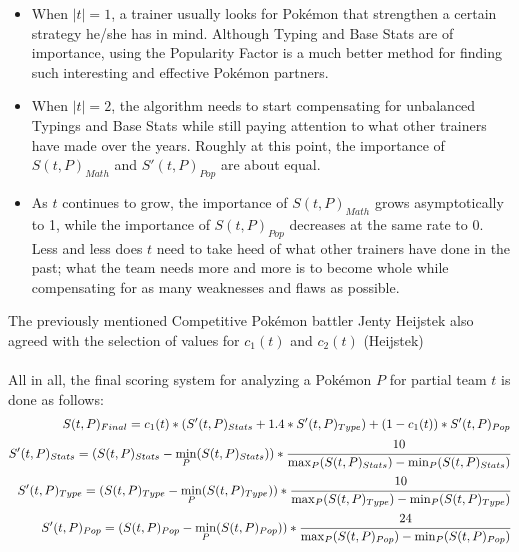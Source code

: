 \documentclass{article}
\begin{document}
\begin{itemize}
	\item When $|t|=1$, a trainer usually looks for Pok\'emon that strengthen a certain strategy he/she has in mind. Although Typing and Base Stats are of importance, using the Popularity Factor is a much better method for finding such interesting and effective Pok\'emon partners.
	\item When $|t|=2$, the algorithm needs to start compensating for unbalanced Typings and Base Stats while still paying attention to what other trainers have made over the years. Roughly at this point, the importance of $S(t,P)_{Math}$ and $S'(t,P)_{Pop}$ are about equal.
	\item As $t$ continues to grow, the importance of $S(t,P)_{Math}$ grows asymptotically to 1, while the importance of $S(t,P)_{Pop}$ decreases at the same rate to 0. Less and less does $t$ need to take heed of what other trainers have done in the past; what the team needs more and more is to become whole while compensating for as many weaknesses and flaws as possible.
\end{itemize}
The previously mentioned Competitive Pok\'emon battler Jenty Heijstek also agreed with the selection of values for $c_1(t)$ and $c_2(t)$ (Heijstek)\\\\
All in all, the final scoring system for analyzing a Pok\'emon $P$ for partial team $t$ is done as follows:
\begin{eqnarray*}
	S(t,P)_{Final}=c_1(t)*(S'(t,P)_{Stats}+1.4*S'(t,P)_{Type})+(1-c_1(t))*S'(t,P)_{Pop}\\
	S'(t,P)_{Stats}=(S(t,P)_{Stats}-\min_P(S(t,P)_{Stats}))*\cfrac{10}{\max_P(S(t,P)_{Stats})-\min_P(S(t,P)_{Stats})}\\
	S'(t,P)_{Type}=(S(t,P)_{Type}-\min_P(S(t,P)_{Type}))*\cfrac{10}{\max_P(S(t,P)_{Type})-\min_P(S(t,P)_{Type})}\\
	S'(t,P)_{Pop}=(S(t,P)_{Pop}-\min_P(S(t,P)_{Pop}))*\cfrac{24}{\max_P(S(t,P)_{Pop})-\min_P(S(t,P)_{Pop})}
\end{eqnarray*}
\end{document}
